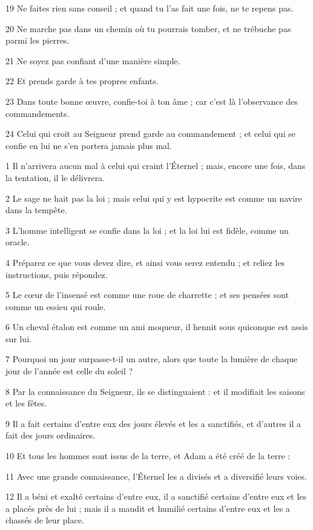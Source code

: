 \par 19 Ne faites rien sans conseil ; et quand tu l'as fait une fois, ne te repens pas.
\par 20 Ne marche pas dans un chemin où tu pourrais tomber, et ne trébuche pas parmi les pierres.
\par 21 Ne soyez pas confiant d'une manière simple.
\par 22 Et prends garde à tes propres enfants.
\par 23 Dans toute bonne œuvre, confie-toi à ton âme ; car c'est là l'observance des commandements.
\par 24 Celui qui croit au Seigneur prend garde au commandement ; et celui qui se confie en lui ne s'en portera jamais plus mal.


\par 1 Il n'arrivera aucun mal à celui qui craint l'Éternel ; mais, encore une fois, dans la tentation, il le délivrera.
\par 2 Le sage ne hait pas la loi ; mais celui qui y est hypocrite est comme un navire dans la tempête.
\par 3 L'homme intelligent se confie dans la loi ; et la loi lui est fidèle, comme un oracle.
\par 4 Préparez ce que vous devez dire, et ainsi vous serez entendu ; et reliez les instructions, puis répondez.
\par 5 Le cœur de l'insensé est comme une roue de charrette ; et ses pensées sont comme un essieu qui roule.
\par 6 Un cheval étalon est comme un ami moqueur, il hennit sous quiconque est assis sur lui.
\par 7 Pourquoi un jour surpasse-t-il un autre, alors que toute la lumière de chaque jour de l'année est celle du soleil ?
\par 8 Par la connaissance du Seigneur, ils se distinguaient : et il modifiait les saisons et les fêtes.
\par 9 Il a fait certains d'entre eux des jours élevés et les a sanctifiés, et d'autres il a fait des jours ordinaires.
\par 10 Et tous les hommes sont issus de la terre, et Adam a été créé de la terre :
\par 11 Avec une grande connaissance, l'Éternel les a divisés et a diversifié leurs voies.
\par 12 Il a béni et exalté certains d'entre eux, il a sanctifié certains d'entre eux et les a placés près de lui ; mais il a maudit et humilié certains d'entre eux et les a chassés de leur place.
